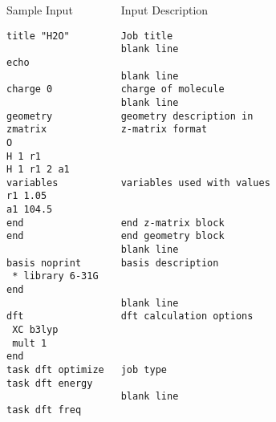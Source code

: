 \documentclass[slidestop,mathserif,compress,xcolor=svgnames]{beamer}
\begin{document}
\begin{frame}[fragile]
\tiny{
\begin{columns}
\column{6.5cm}
\begin{block}{Sample Input}
\begin{verbatim}
title "H2O"

echo

charge 0

geometry
zmatrix
O
H 1 r1
H 1 r1 2 a1
variables
r1 1.05 
a1 104.5
end
end

basis noprint
 * library 6-31G
end

dft
 XC b3lyp
 mult 1
end
task dft optimize
task dft energy

task dft freq
\end{verbatim}
\end{block}
\column{5cm}
{\color{tigersblue}
\begin{alertblock}{Input Description}
\begin{verbatim}
Job title
blank line

blank line
charge of molecule
blank line
geometry description in
z-matrix format



variables used with values
 

end z-matrix block
end geometry block
blank line
basis description
 
 
blank line
dft calculation options
 
 

job type

blank line

\end{verbatim}
\end{alertblock}
}
\end{columns}
}
\end{frame}
\end{document}
